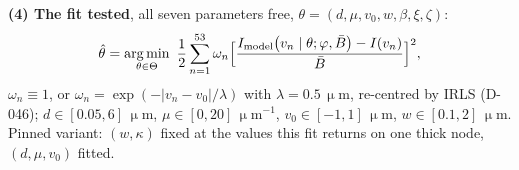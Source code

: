 \documentclass[11pt,varwidth=17.6cm,border=14pt]{standalone}
\DeclareMathOperator*{\argmin}{arg\,min}
\newcommand{\um}{\,\upmu\mathrm{m}}
\newcommand{\Imod}{I_{\mathrm{model}}}
\begin{document}
\medskip
\textbf{(4) The fit tested}, all seven parameters free, $\theta=(d,\mu,v_0,w,\beta,\xi,\zeta)$:
\begin{equation*}
\hat\theta=\argmin_{\theta\in\Theta}\ \frac12\sum_{n=1}^{53}\omega_n\Bigl[\frac{\Imod\bigl(v_n\mid\theta;\varphi,\bar B\bigr)-I(v_n)}{\bar B}\Bigr]^{2},
\end{equation*}
$\omega_n\equiv1$, or $\omega_n=\exp(-\lvert v_n-v_0\rvert/\lambda)$ with $\lambda=0.5\um$, re-centred by IRLS (D-046); $d\in[0.05,6]\um$, $\mu\in[0,20]\,\upmu\mathrm{m}^{-1}$, $v_0\in[-1,1]\um$, $w\in[0.1,2]\um$. Pinned variant: $(w,\kappa)$ fixed at the values this fit returns on one thick node, $(d,\mu,v_0)$ fitted.
\end{document}
